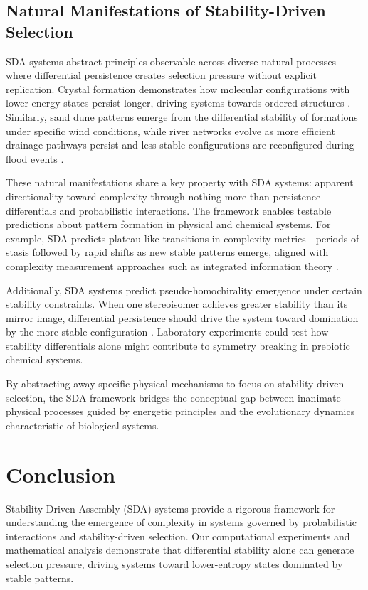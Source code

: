 \documentclass[preprint,12pt]{elsarticle}
\begin{document}
\subsection{Natural Manifestations of Stability-Driven Selection}

SDA systems abstract principles observable across diverse natural processes where differential persistence creates selection pressure without explicit replication. Crystal formation demonstrates how molecular configurations with lower energy states persist longer, driving systems towards ordered structures \cite{ball1999self}. Similarly, sand dune patterns emerge from the differential stability of formations under specific wind conditions, while river networks evolve as more efficient drainage pathways persist and less stable configurations are reconfigured during flood events \cite{kelso1997dynamic}.

These natural manifestations share a key property with SDA systems: apparent directionality toward complexity through nothing more than persistence differentials and probabilistic interactions. The framework enables testable predictions about pattern formation in physical and chemical systems. For example, SDA predicts plateau-like transitions in complexity metrics - periods of stasis followed by rapid shifts as new stable patterns emerge, aligned with complexity measurement approaches such as integrated information theory \cite{tononi2008phi}.

Additionally, SDA systems predict pseudo-homochirality emergence under certain stability constraints. When one stereoisomer achieves greater stability than its mirror image, differential persistence should drive the system toward domination by the more stable configuration \cite{blackmond2010chiral}. Laboratory experiments could test how stability differentials alone might contribute to symmetry breaking in prebiotic chemical systems.

By abstracting away specific physical mechanisms to focus on stability-driven selection, the SDA framework bridges the conceptual gap between inanimate physical processes guided by energetic principles and the evolutionary dynamics characteristic of biological systems.

\section{Conclusion}

Stability-Driven Assembly (SDA) systems provide a rigorous framework for understanding the emergence of complexity in systems governed by probabilistic interactions and stability-driven selection. Our computational experiments and mathematical analysis demonstrate that differential stability alone can generate selection pressure, driving systems toward lower-entropy states dominated by stable patterns.
\end{document}
